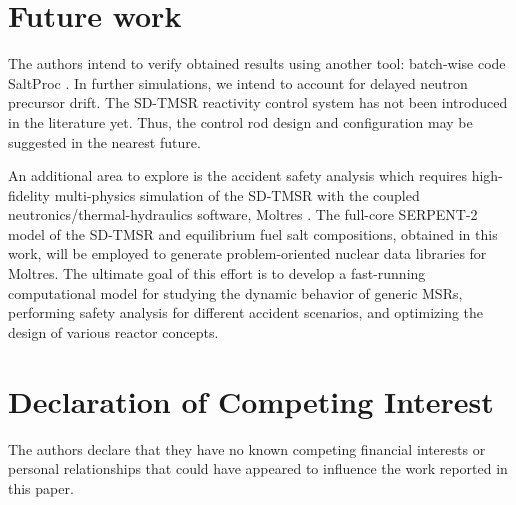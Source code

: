 \section{Future work}
The authors intend to verify obtained results using another tool: batch-wise 
code SaltProc \cite{rykhlevskii_arfc/saltproc_2018,rykhlevskii_milestone_2019}.
In further simulations, we intend to account for delayed 
neutron precursor drift. The \gls{SD-TMSR} reactivity control system has not 
been introduced in the literature yet. Thus, the control rod design and 
configuration may be suggested in the nearest future.

An additional area to explore is the accident safety analysis which 
requires high-fidelity multi-physics simulation of the \gls{SD-TMSR} with the 
coupled neutronics/thermal-hydraulics software, Moltres 
\cite{lindsay_introduction_2018}. The full-core SERPENT-2 model of the 
\gls{SD-TMSR} and equilibrium fuel salt compositions, obtained in this work, 
will be employed to generate problem-oriented nuclear data libraries for 
Moltres. The ultimate goal of this effort is to develop a 
fast-running computational model for studying the dynamic behavior of generic 
\glspl{MSR}, performing safety analysis for different accident scenarios, and 
optimizing the design of various reactor concepts.

\section{Declaration of Competing Interest}

The authors declare that they have no known competing financial interests or personal relationships that could have appeared to influence the work reported in this paper.
